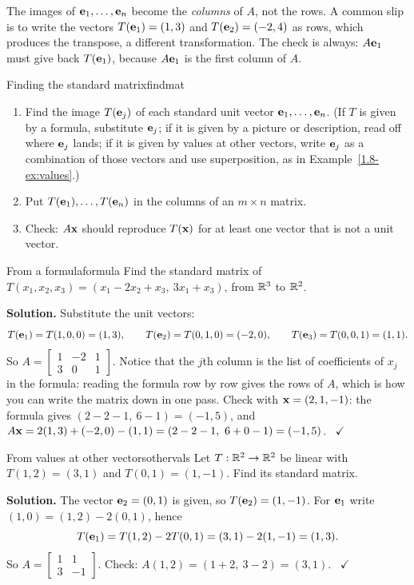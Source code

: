 \documentclass[11pt]{article}
\begin{document}
\begin{warn}
The images of $\mathbf{e}_1,\dots,\mathbf{e}_n$ become the \emph{columns} of $A$, not the rows. A common slip is to write the vectors $T(\mathbf{e}_1)=(1,3)$ and $T(\mathbf{e}_2)=(-2,4)$ as rows, which produces the transpose, a different transformation. The check is always: $A\mathbf{e}_1$ must give back $T(\mathbf{e}_1)$, because $A\mathbf{e}_1$ is the first column of $A$.
\end{warn}

\begin{proc}{Finding the standard matrix}{findmat}
\begin{enumerate}
  \item Find the image $T(\mathbf{e}_j)$ of each standard unit vector $\mathbf{e}_1,\dots,\mathbf{e}_n$. (If $T$ is given by a formula, substitute $\mathbf{e}_j$; if it is given by a picture or description, read off where $\mathbf{e}_j$ lands; if it is given by values at other vectors, write $\mathbf{e}_j$ as a combination of those vectors and use superposition, as in Example~\ref{1.8-ex:values}.)
  \item Put $T(\mathbf{e}_1),\dots,T(\mathbf{e}_n)$ in the columns of an $m\times n$ matrix.
  \item Check: $A\mathbf{x}$ should reproduce $T(\mathbf{x})$ for at least one vector that is not a unit vector.
\end{enumerate}
\end{proc}

\begin{exmp}{From a formula}{formula}
Find the standard matrix of $T(x_1,x_2,x_3)=(x_1-2x_2+x_3,\ 3x_1+x_3)$, from $\mathbb{R}^3$ to $\mathbb{R}^2$.

\textbf{Solution.} Substitute the unit vectors:
\[
T(\mathbf{e}_1)=T(1,0,0)=(1,3),\qquad T(\mathbf{e}_2)=T(0,1,0)=(-2,0),\qquad T(\mathbf{e}_3)=T(0,0,1)=(1,1).
\]
So $A=\begin{bmatrix}1&-2&1\\3&0&1\end{bmatrix}$. Notice that the $j$th column is the list of coefficients of $x_j$ in the formula: reading the formula row by row gives the rows of $A$, which is how you can write the matrix down in one pass. Check with $\mathbf{x}=(2,1,-1)$: the formula gives $(2-2-1,\ 6-1)=(-1,5)$, and $A\bv{x}=2(1,3)+(-2,0)-(1,1)=(2-2-1,\ 6+0-1)=(-1,5)$. \ $\checkmark$
\end{exmp}

\begin{exmp}{From values at other vectors}{othervals}
Let $T:\mathbb{R}^2\to\mathbb{R}^2$ be linear with $T(1,2)=(3,1)$ and $T(0,1)=(1,-1)$. Find its standard matrix.

\textbf{Solution.} The vector $\mathbf{e}_2=(0,1)$ is given, so $T(\mathbf{e}_2)=(1,-1)$. For $\mathbf{e}_1$ write $(1,0)=(1,2)-2(0,1)$, hence
\[
T(\mathbf{e}_1)=T(1,2)-2T(0,1)=(3,1)-2(1,-1)=(1,3).
\]
So $A=\begin{bmatrix}1&1\\3&-1\end{bmatrix}$. Check: $A(1,2)=(1+2,\ 3-2)=(3,1)$. \ $\checkmark$
\end{exmp}
\end{document}
